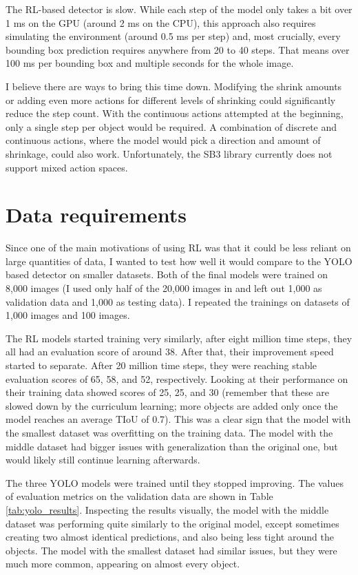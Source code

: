 \documentclass[
  digital,     %
  oneside,     %
  nosansbold,  %
  nocolorbold, %
  lof,         %
  lot,         %
]{fithesis4}
\begin{document}
The RL-based detector is slow. While each step of the model only takes a bit over 1 ms on the GPU (around 2 ms on the CPU), this approach also requires simulating the environment (around 0.5 ms per step) and, most crucially, every bounding box prediction requires anywhere from 20 to 40 steps. That means over 100 ms per bounding box and multiple seconds for the whole image.

I believe there are ways to bring this time down. Modifying the shrink amounts or adding even more actions for different levels of shrinking could significantly reduce the step count. With the continuous actions attempted at the beginning, only a single step per object would be required. A combination of discrete and continuous actions, where the model would pick a direction and amount of shrinkage, could also work. Unfortunately, the SB3 library currently does not support mixed action spaces.

\section{Data requirements}

Since one of the main motivations of using RL was that it could be less reliant on large quantities of data, I wanted to test how well it would compare to the YOLO based detector on smaller datasets. Both of the final models were trained on 8,000 images (I used only half of the 20,000 images in \cite{aydos2020} and left out 1,000 as validation data and 1,000 as testing data). I repeated the trainings on datasets of 1,000 images and 100 images.

The RL models started training very similarly, after eight million time steps, they all had an evaluation score of around 38. After that, their improvement speed started to separate. After 20 million time steps, they were reaching stable evaluation scores of 65, 58, and 52, respectively. Looking at their performance on their training data showed scores of 25, 25, and 30 (remember that these are slowed down by the curriculum learning; more objects are added only once the model reaches an average TIoU of 0.7). This was a clear sign that the model with the smallest dataset was overfitting on the training data. The model with the middle dataset had bigger issues with generalization than the original one, but would likely still continue learning afterwards.

The three YOLO models were trained until they stopped improving. The values of evaluation metrics on the validation data are shown in Table \ref{tab:yolo_results}. Inspecting the results visually, the model with the middle dataset was performing quite similarly to the original model, except sometimes creating two almost identical predictions, and also being less tight around the objects. The model with the smallest dataset had similar issues, but they were much more common, appearing on almost every object.
\end{document}
